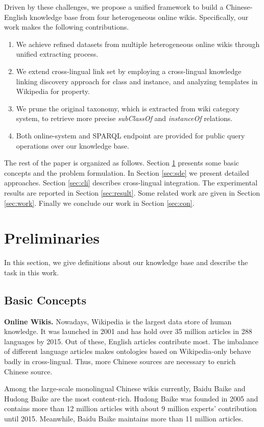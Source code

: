 \documentclass[runningheads,a4paper]{llncs}
\newcommand{\para}[1]{\vspace{0.1cm}\noindent\textbf{#1}}
\begin{document}
Driven by these challenges, we propose a unified framework to build a Chinese-English knowledge base from four heterogeneous online wikis. Specifically, our work makes the following contributions.
\begin{enumerate}
  \item We achieve refined datasets from multiple heterogeneous online wikis through unified extracting process.
  \item We extend cross-lingual link set by employing a cross-lingual knowledge linking discovery approach for class and instance, and analyzing templates in Wikipedia for property.
  \item We prune the original taxonomy, which is extracted from wiki category system, to retrieve more precise \textit{subClassOf} and \textit{instanceOf} relations.
  \item Both online-system and SPARQL endpoint are provided for public query operations over our knowledge base.
\end{enumerate}

The rest of the paper is organized as follows. Section \ref{sec:pd} presents some basic concepts and the problem formulation. In Section \ref{sec:sde} we present detailed approaches. Section \ref{sec:cli} describes cross-lingual integration. The experimental results are reported in Section \ref{sec:result}. Some related work are given in Section \ref{sec:work}. Finally we conclude our work in Section \ref{sec:con}.

\section{Preliminaries}
\label{sec:pd}
In this section, we give definitions about our knowledge base and describe the task in this work.

\subsection{Basic Concepts}
\para{Online Wikis.} Nowadays, Wikipedia is the largest data store of human knowledge. It was launched in 2001 and has hold over 35 million articles in 288 languages by 2015. Out of these, English articles contribute most. The imbalance of different language articles makes ontologies based on Wikipedia-only behave badly in cross-lingual. Thus, more Chinese sources are necessary to enrich Chinese source.

Among the large-scale monolingual Chinese wikis currently, Baidu Baike and Hudong Baike are the most content-rich. Hudong Baike was founded in 2005 and contains more than 12 million articles with about 9 million experts' contribution until 2015. Meanwhile, Baidu Baike maintains more than 11 million articles.
\end{document}

